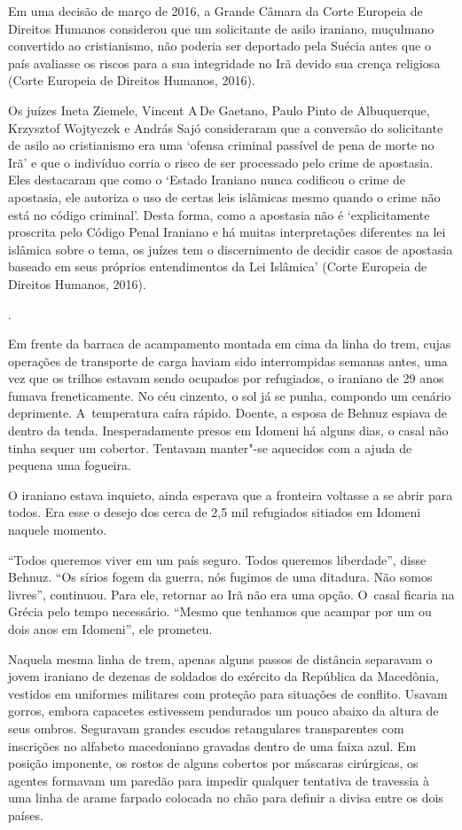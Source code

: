 {Em uma decisão de março de 2016, a Grande Câmara da Corte Europeia de
Direitos Humanos considerou que um solicitante de asilo iraniano,
muçulmano convertido ao cristianismo, não poderia ser deportado pela
Suécia antes que o país avaliasse os riscos para a sua integridade no
Irã devido sua crença religiosa (Corte Europeia de Direitos Humanos,
2016).

Os juízes Ineta Ziemele, Vincent A\,De Gaetano, Paulo Pinto de
Albuquerque, Krzysztof Wojtyczek e András Sajó consideraram que a
conversão do solicitante de asilo ao cristianismo era uma `ofensa
criminal passível de pena de morte no Irã' e que o indivíduo corria o
risco de ser processado pelo crime de apostasia. Eles destacaram que como
o `Estado Iraniano nunca codificou o crime de apostasia, ele autoriza o
uso de certas leis islâmicas mesmo quando o crime não está no código
criminal'. Desta forma, como a apostasia não é `explicitamente proscrita
pelo Código Penal Iraniano e há muitas interpretações diferentes na lei
islâmica sobre o tema, os juízes tem o discernimento de decidir casos de
apostasia baseado em seus próprios entendimentos da Lei Islâmica' (Corte
Europeia de Direitos Humanos, 2016).
}.

Em frente da barraca de acampamento montada em cima da linha do trem,
cujas operações de transporte de carga haviam sido interrompidas semanas
antes, uma vez que os trilhos estavam sendo ocupados por refugiados, o iraniano
de 29 anos fumava freneticamente. No céu cinzento, o sol já se punha,
compondo um cenário deprimente. A~temperatura caíra rápido. Doente, a
esposa de Behnuz espiava de dentro da tenda. Inesperadamente presos em
Idomeni há alguns dias, o casal não tinha sequer um cobertor. Tentavam
manter"-se aquecidos com a ajuda de pequena uma fogueira.

O iraniano estava inquieto, ainda esperava que a fronteira voltasse a se
abrir para todos. Era esse o desejo dos cerca de 2,5 mil refugiados
sitiados em Idomeni naquele momento.

``Todos queremos viver em um país seguro. Todos queremos liberdade'',
disse Behnuz. ``Os sírios fogem da guerra, nós fugimos de uma ditadura.
Não somos livres'', continuou. Para ele, retornar ao Irã não era uma
opção. O~casal ficaria na Grécia pelo tempo necessário.
``Mesmo que tenhamos que acampar por um ou dois anos em Idomeni'', ele prometeu.

Naquela mesma linha de trem, apenas alguns passos de distância separavam
o jovem iraniano de dezenas de soldados do exército da República da
Macedônia, vestidos em uniformes militares com proteção para situações
de conflito. Usavam gorros, embora capacetes estivessem pendurados um
pouco abaixo da altura de seus ombros. Seguravam grandes escudos
retangulares transparentes com inscrições no alfabeto macedoniano
gravadas dentro de uma faixa azul. Em posição imponente, os rostos de
alguns cobertos por máscaras cirúrgicas, os agentes formavam um paredão
para impedir qualquer tentativa de travessia à uma linha de arame
farpado colocada no chão para definir a divisa entre os dois países.

